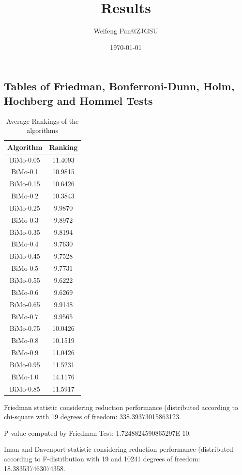 \documentclass[a4paper,10pt]{article}
\title{Results}
\author{Weifeng Pan@ZJGSU}
\date{\today}
\begin{document}
\begin{landscape}
\oddsidemargin 0in \topmargin 0in\maketitle
\section{Tables of Friedman, Bonferroni-Dunn, Holm, Hochberg and Hommel Tests}
\begin{table}[!htp]
\centering
\caption{Average Rankings of the algorithms
}\begin{tabular}{c|c}
Algorithm&Ranking\\
\hline
BiMo-0.05&11.4093\\
BiMo-0.1&10.9815\\
BiMo-0.15&10.6426\\
BiMo-0.2&10.3843\\
BiMo-0.25&9.9870\\
BiMo-0.3&9.8972\\
BiMo-0.35&9.8194\\
BiMo-0.4&9.7630\\
BiMo-0.45&9.7528\\
BiMo-0.5&9.7731\\
BiMo-0.55&9.6222\\
BiMo-0.6&9.6269\\
BiMo-0.65&9.9148\\
BiMo-0.7&9.9565\\
BiMo-0.75&10.0426\\
BiMo-0.8&10.1519\\
BiMo-0.9&11.0426\\
BiMo-0.95&11.5231\\
BiMo-1.0&14.1176\\
BiMo-0.85&11.5917\\
\end{tabular}
\end{table}


Friedman statistic considering reduction performance (distributed according to chi-square with 19 degrees of freedom: 338.39373015863123.


P-value computed by Friedman Test: 1.7248824590865297E-10.\newline

Iman and Davenport statistic considering reduction performance (distributed according to F-distribution with 19 and 10241 degrees of freedom: 18.383537463074358.



\end{landscape}
\end{document}
